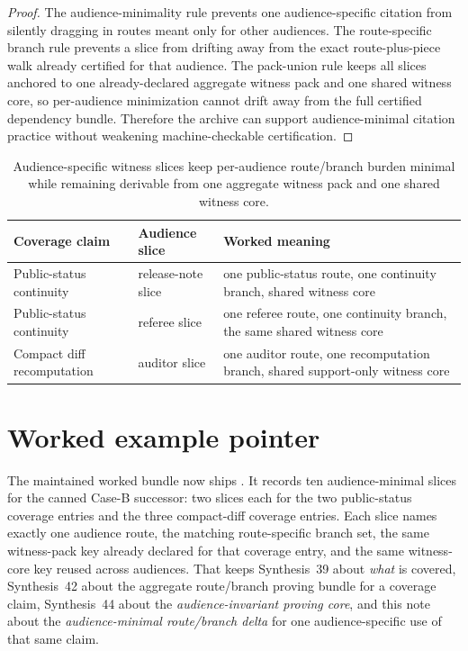 \documentclass[11pt]{article}
\begin{document}
\begin{proof}
The audience-minimality rule prevents one audience-specific citation from silently dragging in routes meant only for other audiences.
The route-specific branch rule prevents a slice from drifting away from the exact route-plus-piece walk already certified for that audience.
The pack-union rule keeps all slices anchored to one already-declared aggregate witness pack and one shared witness core, so per-audience minimization cannot drift away from the full certified dependency bundle.
Therefore the archive can support audience-minimal citation practice without weakening machine-checkable certification.\qedhere
\end{proof}

\begin{table}[t]
\centering
\small
\begin{tabularx}{\linewidth}{@{}l l X@{}}
\toprule
Coverage claim & Audience slice & Worked meaning \\
\midrule
Public-status continuity & release-note slice & one public-status route, one continuity branch, shared witness core \\
Public-status continuity & referee slice & one referee route, one continuity branch, the same shared witness core \\
Compact diff recomputation & auditor slice & one auditor route, one recomputation branch, shared support-only witness core \\
\bottomrule
\end{tabularx}
\caption{Audience-specific witness slices keep per-audience route/branch burden minimal while remaining derivable from one aggregate witness pack and one shared witness core.}
\label{tab:witnessslices}
\end{table}

\section{Worked example pointer}
The maintained worked bundle now ships .\cite{series:workedexample}
It records ten audience-minimal slices for the canned Case-B successor: two slices each for the two public-status coverage entries and the three compact-diff coverage entries.
Each slice names exactly one audience route, the matching route-specific branch set, the same witness-pack key already declared for that coverage entry, and the same witness-core key reused across audiences.
That keeps Synthesis~39 about \emph{what} is covered, Synthesis~42 about the aggregate route/branch proving bundle for a coverage claim, Synthesis~44 about the \emph{audience-invariant proving core}, and this note about the \emph{audience-minimal route/branch delta} for one audience-specific use of that same claim.\cite{series:challengecoverage,series:challengecoveragewitnesspacks,series:challengecoveragewitnesscores}
\end{document}
